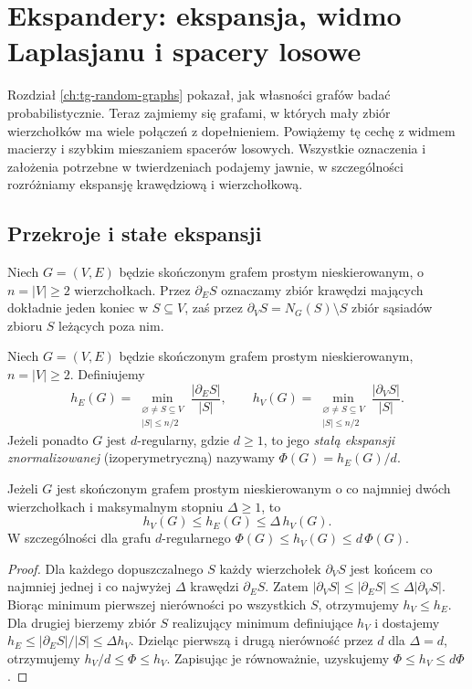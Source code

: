 \chapter{Ekspandery: ekspansja, widmo Laplasjanu i spacery losowe}
\label{ch:tg-expanders}

Rozdział \ref{ch:tg-random-graphs} pokazał, jak własności
grafów badać probabilistycznie. Teraz zajmiemy się grafami,
w których mały zbiór wierzchołków ma wiele połączeń
z dopełnieniem. Powiążemy tę cechę z widmem macierzy
i szybkim mieszaniem spacerów losowych.
Wszystkie oznaczenia i założenia potrzebne w twierdzeniach
podajemy jawnie, w szczególności rozróżniamy
ekspansję krawędziową i wierzchołkową.

\section{Przekroje i stałe ekspansji}
\label{sec:tg-expanders-expansion}

Niech $G=(V,E)$ będzie skończonym grafem prostym
nieskierowanym, o $n=|V|\geq2$ wierzchołkach.
Przez $\partial_E S$ oznaczamy zbiór krawędzi
mających dokładnie jeden koniec w $S\subseteq V$,
zaś przez $\partial_V S=N_G(S)\setminus S$
zbiór sąsiadów zbioru $S$ leżących poza nim.

\begin{definicja}
\label{def:tg-expander-constants}
Niech $G=(V,E)$ będzie skończonym grafem prostym
nieskierowanym, $n=|V|\geq2$. Definiujemy
\[
h_E(G)=
\min_{\substack{\varnothing\ne S\subseteq V\\|S|\leq n/2}}
\frac{|\partial_E S|}{|S|},
\qquad
h_V(G)=
\min_{\substack{\varnothing\ne S\subseteq V\\|S|\leq n/2}}
\frac{|\partial_V S|}{|S|}.
\]
Jeżeli ponadto $G$ jest $d$-regularny, gdzie $d\geq1$,
to jego \emph{stałą ekspansji znormalizowanej}
(izoperymetryczną) nazywamy
$\Phi(G)=h_E(G)/d$.
\end{definicja}

\begin{stwierdzenie}
\label{prop:tg-expander-edge-vertex}
Jeżeli $G$ jest skończonym grafem prostym
nieskierowanym o co najmniej dwóch wierzchołkach
i maksymalnym stopniu $\Delta\geq1$, to
\[
h_V(G)\leq h_E(G)\leq\Delta\,h_V(G).
\]
W szczególności dla grafu $d$-regularnego
$\Phi(G)\leq h_V(G)\leq d\,\Phi(G)$.
\end{stwierdzenie}
\begin{proof}
Dla każdego dopuszczalnego $S$
każdy wierzchołek $\partial_VS$
jest końcem co najmniej jednej
i co najwyżej $\Delta$ krawędzi $\partial_ES$.
Zatem $|\partial_VS|\leq|\partial_ES|
\leq\Delta|\partial_VS|$.
Biorąc minimum pierwszej nierówności
po wszystkich $S$, otrzymujemy $h_V\leq h_E$.
Dla drugiej bierzemy zbiór $S$ realizujący
minimum definiujące $h_V$ i dostajemy
$h_E\leq|\partial_ES|/|S|
\leq\Delta h_V$.
Dzieląc pierwszą i drugą nierówność przez $d$
dla $\Delta=d$, otrzymujemy
$h_V/d\leq\Phi\leq h_V$.
Zapisując je równoważnie, uzyskujemy
$\Phi\leq h_V\leq d\Phi$.
\end{proof}

